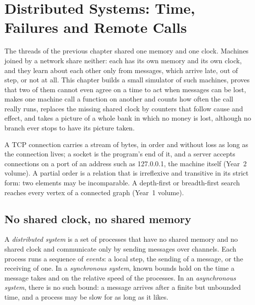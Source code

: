 \chapter{Distributed Systems: Time, Failures and Remote Calls}\label{ch:b3:distributed-systems}

The threads of the previous chapter shared one memory and one clock. Machines joined by a network share neither: each has its own memory and its own clock, and they learn about each other only from messages, which arrive late, out of step, or not at all. This chapter builds a small simulator of such machines, proves that two of them cannot even agree on a time to act when messages can be lost, makes one machine call a function on another and counts how often the call really runs, replaces the missing shared clock by counters that follow cause and effect, and takes a picture of a whole bank in which no money is lost, although no branch ever stops to have its picture taken.

\begin{recall}
A TCP connection carries a stream of bytes, in order and without loss as long as the connection lives; a socket is the program's end of it, and a server accepts connections on a port of an address such as 127.0.0.1, the machine itself (Year~2 volume). A partial order is a relation that is irreflexive and transitive in its strict form: two elements may be incomparable. A depth-first or breadth-first search reaches every vertex of a connected graph (Year~1 volume).
\end{recall}

\section{No shared clock, no shared memory}\label{sec:b3:distributed-systems:model}

\begin{definition}\label{def:b3:distributed-systems:model}
A \emph{distributed system} is a set of processes that have no shared memory and no shared clock and communicate only by sending messages over channels. Each process runs a sequence of \emph{events}: a local step, the sending of a message, or the receiving of one. In a \emph{synchronous system}, known bounds hold on the time a message takes and on the relative speed of the processes. In an \emph{asynchronous system}, there is no such bound: a message arrives after a finite but unbounded time, and a process may be slow for as long as it likes.
\end{definition}

